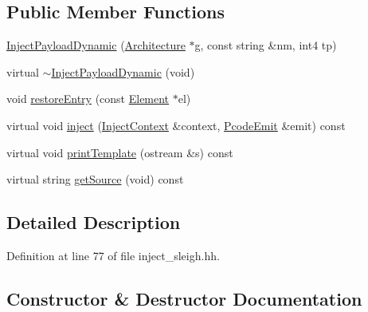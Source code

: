 \subsection*{Public Member Functions}
\begin{DoxyCompactItemize}
\item 
\mbox{\hyperlink{class_inject_payload_dynamic_a3f24e368f1073084237d16b88efd7aac}{Inject\+Payload\+Dynamic}} (\mbox{\hyperlink{class_architecture}{Architecture}} $\ast$g, const string \&nm, int4 tp)
\item 
virtual \mbox{\hyperlink{class_inject_payload_dynamic_ad5024c88c8278aef91d19718ffb6804b}{$\sim$\+Inject\+Payload\+Dynamic}} (void)
\item 
void \mbox{\hyperlink{class_inject_payload_dynamic_a0cce9f9b5053cacbd52f4635a687bae2}{restore\+Entry}} (const \mbox{\hyperlink{class_element}{Element}} $\ast$el)
\item 
virtual void \mbox{\hyperlink{class_inject_payload_dynamic_a3016f641e5901ad165b08969ac33730f}{inject}} (\mbox{\hyperlink{class_inject_context}{Inject\+Context}} \&context, \mbox{\hyperlink{class_pcode_emit}{Pcode\+Emit}} \&emit) const
\item 
virtual void \mbox{\hyperlink{class_inject_payload_dynamic_a683f6cc0b43395ad3644743f95292d59}{print\+Template}} (ostream \&s) const
\item 
virtual string \mbox{\hyperlink{class_inject_payload_dynamic_a8c3b9e0779ebc8369ad309d2299b46b6}{get\+Source}} (void) const
\end{DoxyCompactItemize}


\subsection{Detailed Description}


Definition at line 77 of file inject\+\_\+sleigh.\+hh.



\subsection{Constructor \& Destructor Documentation}
\mbox{\label{class_inject_payload_dynamic_a3f24e368f1073084237d16b88efd7aac}} 
